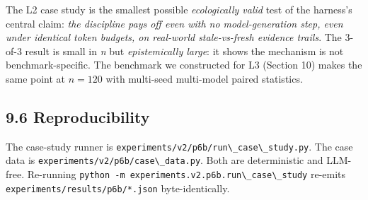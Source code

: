 The L2 case study is the smallest possible \emph{ecologically valid} test of the harness's central claim: \emph{the discipline pays off even with no model-generation step, even under identical token budgets, on real-world stale-vs-fresh evidence trails}. The 3-of-3 result is small in \emph{n} but \emph{epistemically large}: it shows the mechanism is not benchmark-specific. The benchmark we constructed for L3 (Section 10) makes the same point at \(n=120\) with multi-seed multi-model paired statistics.

\subsection{9.6 Reproducibility}\label{reproducibility}

The case-study runner is \passthrough{\lstinline!experiments/v2/p6b/run\_case\_study.py!}. The case data is \passthrough{\lstinline!experiments/v2/p6b/case\_data.py!}. Both are deterministic and LLM-free. Re-running \passthrough{\lstinline!python -m experiments.v2.p6b.run\_case\_study!} re-emits \passthrough{\lstinline!experiments/results/p6b/*.json!} byte-identically.
